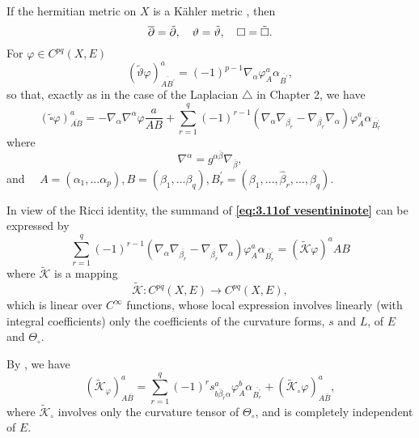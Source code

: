 \documentclass[lang=en,12pt]{beautybook}
\begin{document}
If the hermitian metric on $X$ is a K\"ahler metric \cite[P72]{vesentini1967lectures}, then
\begin{equation*}
\overline{\partial}=\tilde{\partial}, \quad \vartheta=\tilde{\vartheta}, \quad \square=\tilde{\square} .
\end{equation*}
For $\varphi \in C^{p q}(X, E)$
\begin{equation*}
(\tilde{\vartheta} \varphi)_{\overline{A B^{\prime}}}^a=(-1)^{p-1} \nabla_\alpha \varphi_A^a \alpha_{\overline{B^{\prime}}},
\end{equation*}
so that, exactly as in the case of the Laplacian $\triangle$ in Chapter 2, we have
\begin{equation}\label{eq:3.11of vesentininote}
(\tilde{\square} \varphi)_{\overline{A B}}^a=-\nabla_\alpha \nabla^\alpha \varphi \frac{a}{A B}+\sum_{r=1}^q(-1)^{r-1}\left(\nabla_\alpha \nabla_{\overline{\beta_r}}-\nabla_{\overline{\beta_r}} \nabla_\alpha\right) \varphi_A^a \alpha_{\overline{B_r^{\prime}}}
\end{equation}
where
\begin{equation*}
\nabla^\alpha=g^{\alpha \bar{\beta}} \nabla_{\bar{\beta}},
\end{equation*}
and $\quad A=\left(\alpha_1, \ldots \alpha_p\right), B=\left(\beta_1, \ldots \beta_q\right), B_r^{\prime}=\left(\beta_1, \ldots , \hat{\beta}_r, \ldots , \beta_q\right)$.

In view of the Ricci identity, the summand of \textbf{\eqref{eq:3.11of vesentininote}} can be expressed by 
\begin{equation}\label{eq:3.12of vesentininote}
\sum_{r=1}^q(-1)^{r-1}\left(\nabla_\alpha \nabla_{\overline{\beta_r}}-\nabla_{\overline{\beta_r}} \nabla_\alpha\right) \varphi_A^a \alpha_{\overline{B_r^{\prime}}}=(\tilde{\mathcal{K}} \varphi)^a A B
\end{equation}
where $\tilde{\mathcal{K}}$ is a mapping
\begin{equation*}
\tilde{\mathcal{K}}: C^{p q}(X, E) \rightarrow C^{p q}(X, E),
\end{equation*}
which is linear over $C^{\infty}$ functions, whose local expression involves linearly (with integral coefficients) only the coefficients of the curvature forms, $s$ and $L$, of $E$ and $\Theta_{\circ}$.

By \cite[Remark (3) after Lemma 3.2]{vesentini1967lectures}, we have
\begin{equation}\label{eq:3.13of vesentininote}
\left(\tilde{\mathcal{K}}_{\varphi}\right)_{A \bar{B}}^a=\sum_{r=1}^q(-1)^r s_{b \bar{\beta}_r \alpha}^a \varphi_A^b \alpha_{\overline{B_r^{\prime}}}+\left(\tilde{\mathcal{K}}_{\circ} \varphi\right)_{A \bar{B}}^a,
\end{equation}
where $\tilde{\mathcal{K}}_{\circ}$ involves only the curvature tensor of $\Theta_{\circ}$, and is completely independent of $E$.
\end{document}
